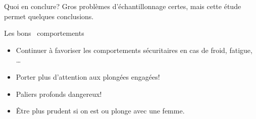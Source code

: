 \begin{frame}{Quoi en conclure?}
Gros problèmes d'échantillonnage certes, mais cette étude permet
quelques conclusions.
\begin{exampleblock}{Les \og bons \fg\ comportements}
\begin{itemize}
\item[\ensuremath{\Rightarrow}] Continuer à favoriser les comportements sécuritaires en cas de froid, fatigue, \dots
\item[\ensuremath{\Rightarrow}] Porter plus d'attention aux plongées engagées!
\item[\ensuremath{\Rightarrow}] Paliers profonds dangereux!
\item[\ensuremath{\Rightarrow}] Être plus prudent si on est ou plonge avec une femme.
\end{itemize}
\end{exampleblock}
\end{frame}
